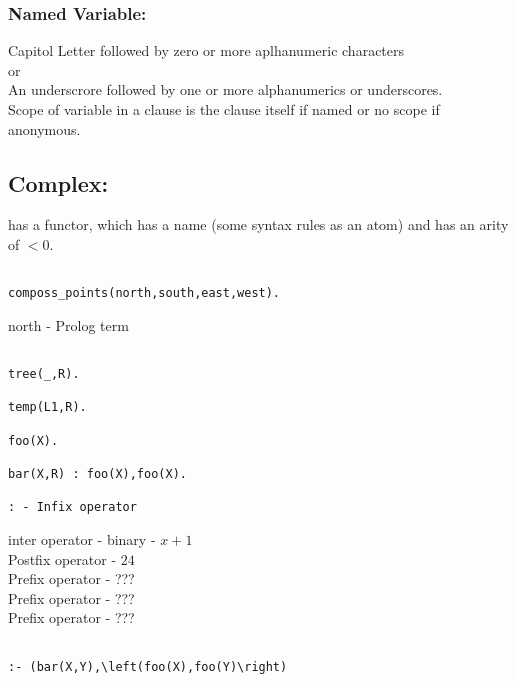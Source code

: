 \documentclass[a4paper,12pt]{article}
\begin{document}
\subsubsection*{Named Variable:}

Capitol Letter followed by zero or more aplhanumeric characters \\

or \\

An underscrore followed by one or more alphanumerics or underscores. \\


Scope of variable in a clause is the clause itself if named or no scope if anonymous.

\subsection*{Complex:}

has a functor, which has a name (some syntax rules as an atom) and has
an arity of $< 0$. \\

\begin{verbatim}

composs_points(north,south,east,west).

\end{verbatim}

north - Prolog term

\begin{verbatim}

tree(_,R).

temp(L1,R).

foo(X).

bar(X,R) : foo(X),foo(X).

: - Infix operator

\end{verbatim}

inter operator - binary - $x + 1$ \\

Postfix operator - $24$ \\

Prefix operator - ??? \\

Prefix operator - ??? \\

Prefix operator - ??? \\


\begin{verbatim}

:- (bar(X,Y),\left(foo(X),foo(Y)\right)

\end{verbatim}
\end{document}

